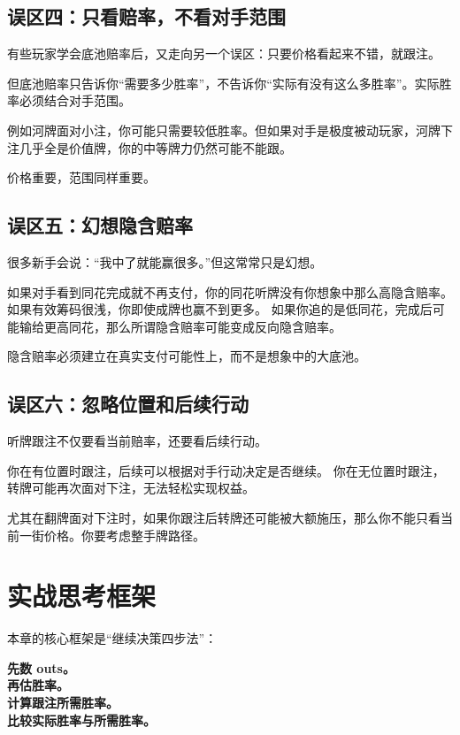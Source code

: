 \subsection{误区四：只看赔率，不看对手范围}

有些玩家学会底池赔率后，又走向另一个误区：只要价格看起来不错，就跟注。

但底池赔率只告诉你“需要多少胜率”，不告诉你“实际有没有这么多胜率”。实际胜率必须结合对手范围。

例如河牌面对小注，你可能只需要较低胜率。但如果对手是极度被动玩家，河牌下注几乎全是价值牌，你的中等牌力仍然可能不能跟。

价格重要，范围同样重要。

\subsection{误区五：幻想隐含赔率}

很多新手会说：“我中了就能赢很多。”但这常常只是幻想。

如果对手看到同花完成就不再支付，你的同花听牌没有你想象中那么高隐含赔率。
如果有效筹码很浅，你即使成牌也赢不到更多。
如果你追的是低同花，完成后可能输给更高同花，那么所谓隐含赔率可能变成反向隐含赔率。

隐含赔率必须建立在真实支付可能性上，而不是想象中的大底池。

\subsection{误区六：忽略位置和后续行动}

听牌跟注不仅要看当前赔率，还要看后续行动。

你在有位置时跟注，后续可以根据对手行动决定是否继续。
你在无位置时跟注，转牌可能再次面对下注，无法轻松实现权益。

尤其在翻牌面对下注时，如果你跟注后转牌还可能被大额施压，那么你不能只看当前一街价格。你要考虑整手牌路径。

\section{实战思考框架}

本章的核心框架是“继续决策四步法”：

\begin{center}
\textbf{先数 outs。\\
再估胜率。\\
计算跟注所需胜率。\\
比较实际胜率与所需胜率。}
\end{center}


